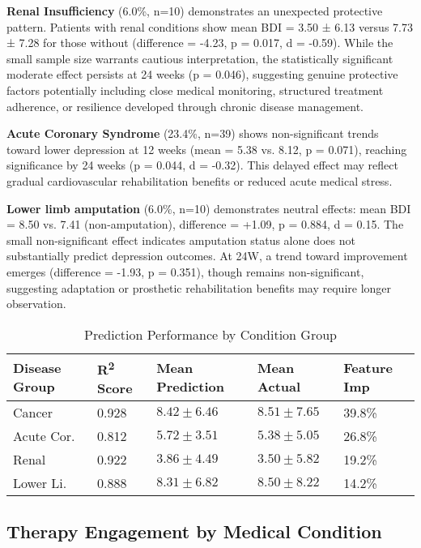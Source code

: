 \documentclass[conference]{IEEEtran}
\begin{document}
\textbf{Renal Insufficiency} (6.0\%, n=10) demonstrates an unexpected protective pattern. Patients with renal conditions show mean BDI = 3.50 ± 6.13 versus 7.73 ± 7.28 for those without (difference = -4.23, p = 0.017, d = -0.59). While the small sample size warrants cautious interpretation, the statistically significant moderate effect persists at 24 weeks (p = 0.046), suggesting genuine protective factors potentially including close medical monitoring, structured treatment adherence, or resilience developed through chronic disease management.

\textbf{Acute Coronary Syndrome} (23.4\%, n=39) shows non-significant trends toward lower depression at 12 weeks (mean = 5.38 vs. 8.12, p = 0.071), reaching significance by 24 weeks (p = 0.044, d = -0.32). This delayed effect may reflect gradual cardiovascular rehabilitation benefits or reduced acute medical stress.

\textbf{Lower limb amputation} (6.0\%, n=10) demonstrates neutral effects: mean BDI = 8.50 vs. 7.41 (non-amputation), difference = +1.09, p = 0.884, d = 0.15. The small non-significant effect indicates amputation status alone does not substantially predict depression outcomes. At 24W, a trend toward improvement emerges (difference = -1.93, p = 0.351), though remains non-significant, suggesting adaptation or prosthetic rehabilitation benefits may require longer observation.




\begin{table}
\centering
\caption{Prediction Performance by Condition Group}
\label{tab:condition_performance}
\begin{tabularx}{\linewidth}{XXXXX}
\hline
\textbf{Disease Group} & \textbf{R\textsuperscript{2} Score} & \textbf{Mean Prediction} & \textbf{Mean Actual} & \textbf{Feature Imp}\\
\midrule
Cancer & 0.928 & $8.42\pm6.46$ & $8.51\pm7.65$ & 39.8\%  \\
Acute Cor. & 0.812 & $5.72\pm3.51$ & $5.38\pm5.05$ & 26.8\% \\
Renal & 0.922 & $3.86\pm4.49$ & $3.50\pm5.82$ & 19.2\% \\
Lower Li. & 0.888 & $8.31\pm6.82$ & $8.50\pm8.22$ & 14.2\% \\
\bottomrule
\end{tabularx}
\end{table}

\subsection{Therapy Engagement by Medical Condition}
\end{document}

